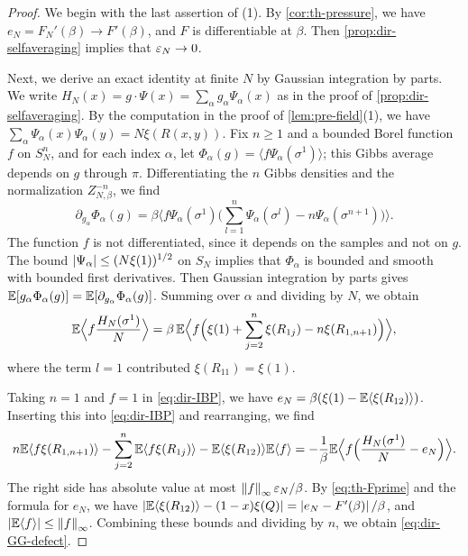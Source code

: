 \begin{proof}
We begin with the last assertion of (1). By \cref{cor:th-pressure}, we have $e_N=F_N'(\beta)\to F'(\beta)$, and $F$ is differentiable at $\beta$. Then \cref{prop:dir-selfaveraging} implies that $\varepsilon_N\to0$.

Next, we derive an exact identity at finite $N$ by Gaussian integration by parts. We write $H_N(x)=g\cdot\Psi(x)=\sum_\alpha g_\alpha\Psi_\alpha(x)$ as in the proof of \cref{prop:dir-selfaveraging}. By the computation in the proof of \cref{lem:pre-field}(1), we have $\sum_\alpha\Psi_\alpha(x)\Psi_\alpha(y)=N\xi(R(x,y))$. Fix $n\ge1$ and a bounded Borel function $f$ on $S_N^n$, and for each index $\alpha$, let $\Phi_\alpha(g)=\langle f\Psi_\alpha(\sigma^1)\rangle$; this Gibbs average depends on $g$ through $\pi$. Differentiating the $n$ Gibbs densities and the normalization $Z_{N,\beta}^{-n}$, we find
\[
\partial_{g_\alpha}\Phi_\alpha(g)=\beta\Big\langle f\Psi_\alpha(\sigma^1)\Big(\sum_{l=1}^n\Psi_\alpha(\sigma^l)-n\Psi_\alpha(\sigma^{n+1})\Big)\Big\rangle.
\]
The function $f$ is not differentiated, since it depends on the samples and not on $g$. The bound $\left|\Psi_\alpha\right|\le(N\xi(1))^{1/2}$ on $S_N$ implies that $\Phi_\alpha$ is bounded and smooth with bounded first derivatives. Then Gaussian integration by parts gives $\mathbb E[g_\alpha\Phi_\alpha(g)]=\mathbb E[\partial_{g_\alpha}\Phi_\alpha(g)]$. Summing over $\alpha$ and dividing by $N$, we obtain
\begin{equation}\label{eq:dir-IBP}
\mathbb E\Big\langle f\frac{H_N(\sigma^1)}N\Big\rangle=\beta\,\mathbb E\Big\langle f\Big(\xi(1)+\sum_{j=2}^n\xi(R_{1j})-n\xi(R_{1,n+1})\Big)\Big\rangle,
\end{equation}
where the term $l=1$ contributed $\xi(R_{11})=\xi(1)$.

Taking $n=1$ and $f=1$ in \eqref{eq:dir-IBP}, we have $e_N=\beta(\xi(1)-\mathbb E\langle\xi(R_{12})\rangle)$. Inserting this into \eqref{eq:dir-IBP} and rearranging, we find
\[
n\mathbb E\langle f\xi(R_{1,n+1})\rangle-\sum_{j=2}^n\mathbb E\langle f\xi(R_{1j})\rangle-\mathbb E\langle\xi(R_{12})\rangle\mathbb E\langle f\rangle=-\frac1\beta\mathbb E\Big\langle f\Big(\frac{H_N(\sigma^1)}N-e_N\Big)\Big\rangle.
\]
The right side has absolute value at most $\left\lVert f\right\rVert_\infty\varepsilon_N/\beta$. By \eqref{eq:th-Fprime} and the formula for $e_N$, we have $\left|\mathbb E\langle\xi(R_{12})\rangle-(1-x)\xi(Q)\right|=\left|e_N-F'(\beta)\right|/\beta$, and $\left|\mathbb E\langle f\rangle\right|\le\left\lVert f\right\rVert_\infty$. Combining these bounds and dividing by $n$, we obtain \eqref{eq:dir-GG-defect}.


\end{proof}
